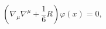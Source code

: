 \begin{equation}
\left( \nabla _{\mu }\nabla ^{\mu }+\frac{1}{6} R\right) \varphi
(x)=0, \label{fieldeq}
\end{equation}

